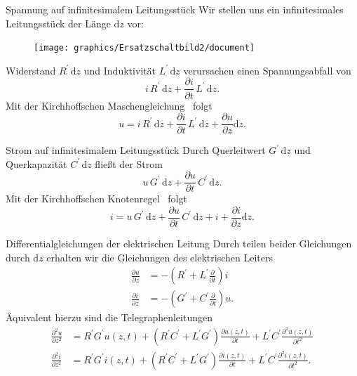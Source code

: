 \documentclass{beamer}
\begin{document}
\begin{frame}{Spannung auf infinitesimalem Leitungsstück}
Wir stellen uns ein infinitesimales Leitungsstück der Länge $\mathrm{d}z$ vor:
\begin{figure}[!htb]
    \begin{center}
        \texttt{[image: graphics/Ersatzschaltbild2/document]}
    \end{center}
\end{figure}
Widerstand $R^{\prime} \, \mathrm{d}z$ und Induktivität $L^{\prime} \, \mathrm{d}z$ verursachen einen Spannungsabfall
von
\[
i \, R^{\prime} \, \mathrm{d}z + \frac{\partial i}{\partial t} \, L^{\prime} \, \mathrm{d}z.
\]
Mit der Kirchhoffschen Maschengleichung~\cite{Kirchhoff} folgt
\begin{equation*}
    u = i \, R^{\prime} \, \mathrm{d}z + \frac{\partial i}{\partial t} \, L^{\prime} \, \mathrm{d}z +
    \frac{\partial u}{\partial z} \mathrm{d}{z}.
\end{equation*}

\end{frame}


\begin{frame}{Strom auf infinitesimalem Leitungsstück}
Durch Querleitwert $G^{\prime} \, \mathrm{d}z$ und Querkapazität $C^{\prime} \, \mathrm{d}z$ fließt der Strom
\[
u \, G^{\prime} \, \mathrm{d}z + \frac{\partial u}{\partial t} \, C^{\prime} \, \mathrm{d}z.
\]
Mit der Kirchhoffschen Knotenregel~\cite{Kirchhoff} folgt
\begin{equation*}
    i = u \, G^{\prime} \, \mathrm{d}z + \frac{\partial u}{\partial t} \, C^{\prime} \, \mathrm{d}z + i +
    \frac{\partial i}{\partial z} \mathrm{d}z.
\end{equation*}

\end{frame}


\begin{frame}{Differentialgleichungen der elektrischen Leitung}
Durch teilen beider Gleichungen durch $\mathrm{d}z$ erhalten wir die \alert{Gleichungen des elektrischen Leiters}
\begin{align}
    \frac{\partial u}{\partial z} &= -\left(R^{\prime} + L^{\prime}\frac{\partial}{\partial t}\right)i \label{eq:Dgl1}
    \\[1ex]
    \frac{\partial i}{\partial z} &= -\left(G^{\prime} + C^{\prime}\frac{\partial}{\partial t}\right)u. \label{eq:Dgl2}
\end{align}
Äquivalent hierzu sind die \alert{Telegraphenleitungen}
\begin{align}
    \frac{\partial^{2} u}{\partial z^{2}} &= R^{\prime} G^{\prime} u(z,t) + (R^{\prime} C^{\prime} + L^{\prime}
    G^{\prime}) \frac{\partial u(z, t)}{\partial t} + L^{\prime} C^{\prime} \frac{\partial^{2} u(z,t)}{\partial t^{2}}
    \label{eq:Tele1} \\[1.5ex]
    \frac{\partial^{2} i}{\partial z^{2}} &= R^{\prime} G^{\prime} i(z,t) + (R^{\prime} C^{\prime} + L^{\prime}
    G^{\prime}) \frac{\partial i(z, t)}{\partial t} + L^{\prime} C^{\prime} \frac{\partial^{2} i(z, t)}{\partial t^{2}}.
\end{align}

\end{frame}
\end{document}

